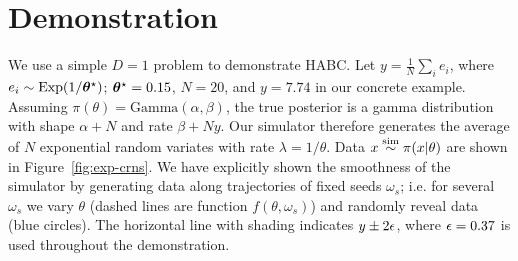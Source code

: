 \documentclass[]{article}
\begin{document}
%



\section{Demonstration}\label{sec:demo}
We use a simple $D=1$ problem to demonstrate HABC.  Let $y= \frac{1}{N} \sum_{i} e_i$, where $e_i \sim \text{Exp}(1/{\bm \theta}^{\star})$; ${\bm \theta}^{\star} = 0.15$, $N=20$, and $y=7.74$ in our concrete example.  Assuming $\pi(\theta ) = \text{Gamma}(\alpha, \beta)$, the true posterior is a gamma distribution with shape $\alpha+N$ and rate $\beta + N y$.  Our simulator therefore generates the average of $N$ exponential random variates with rate $\lambda = 1/\theta$.  Data $x \overset{\operatorname{sim}}{\sim} \pi(x|\theta)$ are shown in Figure~\ref{fig:exp-crns}.  We have explicitly shown the smoothness of the simulator by generating data along trajectories of fixed seeds $\omega_s$; i.e. for several $\omega_s$ we vary $\theta$ (dashed lines are function $f(\theta, \omega_s)$) and randomly reveal data (blue circles).  The horizontal line with shading indicates $y \pm 2 \epsilon$, where $\epsilon = 0.37$ is used throughout the demonstration.



\end{document}
